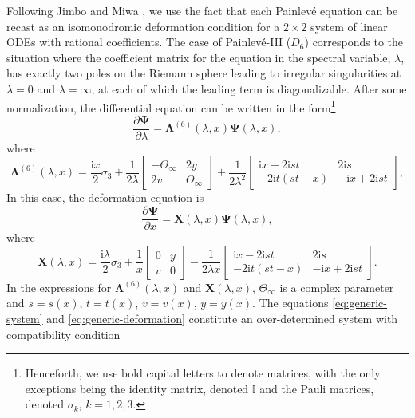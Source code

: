\documentclass[pdftex]{sigma}
\numberwithin{equation}{section}
\newcommand{\ii}{\mathrm{i}}
\begin{document}
Following Jimbo and Miwa \cite{MR625446}, we use the fact that each Painlev\'e equation can be recast as an isomonodromic deformation condition for a $2\times 2$ system of linear ODEs with rational coefficients. The case of Painlev\'e-III ($D_6$) corresponds to the situation where the coefficient matrix for the equation in the spectral variable, $\lambda$, has exactly two poles on the Riemann sphere leading to irregular singularities at $\lambda = 0$ and $\lambda = \infty$, at each of which the leading term is diagonalizable. After some normalization, the differential equation can be written in the form\footnote{Henceforth, we use bold capital letters to denote matrices, with the only exceptions being the identity matrix, denoted $\mathbb{I}$ and the Pauli matrices, denoted $\sigma_k$, $k = 1, 2, 3$.}
\begin{equation}
\label{eq:generic-system}
\frac{\partial\mathbf{\Psi}}{\partial\lambda} = \mathbf{\Lambda}^{(6)}(\lambda, x) \mathbf{\Psi}(\lambda, x),
\end{equation}
where
\begin{equation}
\label{eq:lambda-coefficient-D6}
\mathbf{\Lambda}^{(6)}(\lambda, x) = \frac{\ii x}{2}\sigma_3 + \dfrac{1}{2\lambda} \begin{bmatrix} -\Theta_\infty & 2y \\ 2v & \Theta_\infty \end{bmatrix} + \dfrac{1}{2\lambda^2} \begin{bmatrix} \ii x - 2\ii st & 2\ii s \\ -2\ii t(st - x) & -\ii x + 2\ii st\end{bmatrix},
\end{equation}
In this case, the deformation equation is
\begin{equation}
 \frac{\partial\mathbf{\Psi}}{\partial x} = \mathbf{X}(\lambda, x) \mathbf{\Psi}(\lambda, x),
 \label{eq:generic-deformation}
\end{equation}
where
\begin{equation*}
\mathbf{X}(\lambda, x) = \dfrac{\ii \lambda}{2} \sigma_3 + \dfrac{1}{x} \begin{bmatrix} 0 & y \\ v & 0 \end{bmatrix} - \dfrac{1}{2\lambda x} \begin{bmatrix} \ii x - 2\ii st & 2\ii s \\ -2\ii t(st - x) & -\ii x + 2\ii st\end{bmatrix}.
\end{equation*}
In the expressions for $\mathbf{\Lambda}^{(6)}(\lambda, x)$ and $\mathbf{X}(\lambda, x)$, $\Theta_\infty$ is a complex parameter and $s = s(x)$, $t = t(x)$, $ v = v(x)$, $y = y(x)$. The equations \eqref{eq:generic-system} and \eqref{eq:generic-deformation} constitute an over-determined system with compatibility condition
\end{document}
